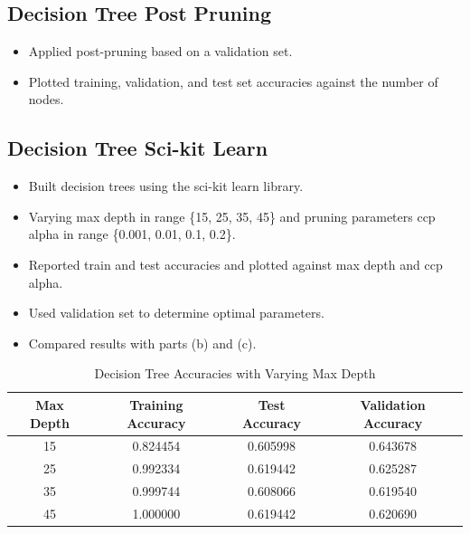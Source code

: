 \documentclass[12pt]{article}
\begin{document}
\subsection{Decision Tree Post Pruning}
    \begin{itemize}
        \item Applied post-pruning based on a validation set.
        \item Plotted training, validation, and test set accuracies against the number of nodes.
    \end{itemize}

\subsection{Decision Tree Sci-kit Learn}
    \begin{itemize}
        \item Built decision trees using the sci-kit learn library.
        \item Varying max depth in range \{15, 25, 35, 45\} and pruning parameters ccp alpha in range \{0.001, 0.01, 0.1, 0.2\}.
        \item Reported train and test accuracies and plotted against max depth and ccp alpha.
        \item Used validation set to determine optimal parameters.
        \item Compared results with parts (b) and (c).
    \end{itemize}



\begin{table}[h]
\centering
\begin{tabular}{|c|c|c|c|}
\hline
\textbf{Max Depth} & \textbf{Training Accuracy} & \textbf{Test Accuracy} & \textbf{Validation Accuracy} \\ \hline
15                 & 0.824454                   & 0.605998               & 0.643678                     \\ \hline
25                 & 0.992334                   & 0.619442               & 0.625287                     \\ \hline
35                 & 0.999744                   & 0.608066               & 0.619540                     \\ \hline
45                 & 1.000000                   & 0.619442               & 0.620690                     \\ \hline
\end{tabular}
\caption{Decision Tree Accuracies with Varying Max Depth}
\label{table:decision_tree_accuracies}
\end{table}
\end{document}
